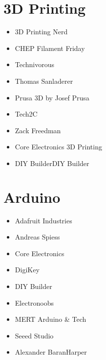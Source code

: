 \documentclass[letterpaper,10pt,english,openany,oneside]{sphinxmanual}
\begin{document}
\section{3D Printing}
\label{\detokenize{youtube:d-printing}}\begin{itemize}
\item {} 
\sphinxAtStartPar
3D Printing Nerd

\item {} 
\sphinxAtStartPar
CHEP Filament Friday

\item {} 
\sphinxAtStartPar
Technivorous

\item {} 
\sphinxAtStartPar
Thomas Sanladerer

\item {} 
\sphinxAtStartPar
Prusa 3D by Josef Prusa

\item {} 
\sphinxAtStartPar
Tech2C

\item {} 
\sphinxAtStartPar
Zack Freedman

\item {} 
\sphinxAtStartPar
Core Electronics 3D Printing

\item {} 
\sphinxAtStartPar
DIY BuilderDIY Builder

\end{itemize}


\section{Arduino}
\label{\detokenize{youtube:arduino}}\begin{itemize}
\item {} 
\sphinxAtStartPar
Adafruit Industries

\item {} 
\sphinxAtStartPar
Andreas Spiess

\item {} 
\sphinxAtStartPar
Core Electronics

\item {} 
\sphinxAtStartPar
Digi\sphinxhyphen{}Key

\item {} 
\sphinxAtStartPar
DIY Builder

\item {} 
\sphinxAtStartPar
Electronoobs

\item {} 
\sphinxAtStartPar
MERT Arduino \& Tech

\item {} 
\sphinxAtStartPar
Seeed Studio

\item {} 
\sphinxAtStartPar
Alexander Baran\sphinxhyphen{}Harper

\end{itemize}
\end{document}
